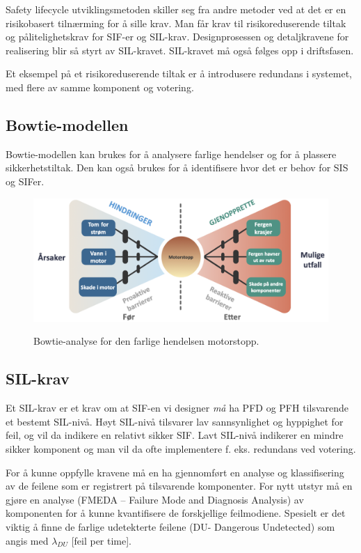 Safety lifecycle utviklingsmetoden skiller seg fra andre metoder ved at det er en risikobasert tilnærming for å sille krav. Man får krav til risikoreduserende tiltak og pålitelighetskrav for SIF-er og SIL-krav. Designprosessen og detaljkravene for realisering blir så styrt av SIL-kravet. SIL-kravet må også følges opp i driftsfasen.

Et eksempel på et risikoreduserende tiltak er å introdusere redundans i systemet, med flere av samme komponent og votering.

\subsection{Bowtie-modellen}

Bowtie-modellen kan brukes for å analysere farlige hendelser og for å plassere sikkerhetstiltak. Den kan også brukes for å identifisere hvor det er behov for SIS og SIFer.

\begin{figure}[H]
    \centering
        \includegraphics[width=\textwidth]{figures/IEC/bowtie.png}\\
        \caption{Bowtie-analyse for den farlige hendelsen motorstopp.}
\end{figure}

\subsection{SIL-krav}

Et SIL-krav er et krav om at SIF-en vi designer \textit{må} ha PFD og PFH tilsvarende et bestemt SIL-nivå. Høyt SIL-nivå tilsvarer lav sannsynlighet og hyppighet for feil, og vil da indikere en relativt sikker SIF. Lavt SIL-nivå indikerer en mindre sikker komponent og man vil da ofte implementere f. eks. redundans ved votering.
 
For å kunne oppfylle kravene må en ha gjennomført en analyse og klassifisering av de feilene som er registrert på tilsvarende komponenter. For nytt utstyr må en gjøre en analyse (FMEDA – Failure Mode and Diagnosis Analysis) av komponenten for å kunne kvantifisere de forskjellige feilmodiene. Spesielt er det viktig å finne de farlige udetekterte feilene (DU- Dangerous Undetected) som angis med $\lambda_{DU}$ [feil per time].

